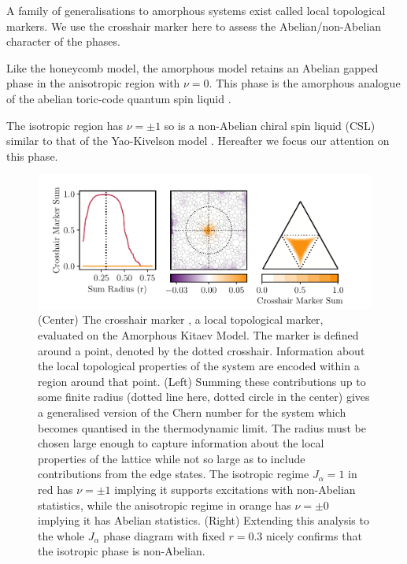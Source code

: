 A family of generalisations to amorphous systems exist
\autocite{mitchellAmorphousTopologicalInsulators2018} called local
topological markers. We use the crosshair marker
\textcite{peru_preprint} here to assess the Abelian/non-Abelian
character of the phases.

Like the honeycomb model, the amorphous model retains an Abelian gapped
phase in the anisotropic region with \(\nu=0\). This phase is the
amorphous analogue of the abelian toric-code quantum spin liquid
\autocite{kitaev_fault-tolerant_2003}.

The isotropic region has \(\nu=\pm1\) so is a non-Abelian chiral spin
liquid (CSL) similar to that of the Yao-Kivelson model
\autocite{yaoExactChiralSpin2007}. Hereafter we focus our attention on
this phase.

\begin{figure}
\hypertarget{fig:phase_diagram_chern}{%
\centering
\includegraphics[width=1\textwidth,height=\textheight]{figure_code/amk_chapter/results/phase_diagram_chern/phase_diagram_chern.pdf}
\caption{(Center) The crosshair marker \textcite{peru_preprint}, a local
topological marker, evaluated on the Amorphous Kitaev Model. The marker
is defined around a point, denoted by the dotted crosshair. Information
about the local topological properties of the system are encoded within
a region around that point. (Left) Summing these contributions up to
some finite radius (dotted line here, dotted circle in the center) gives
a generalised version of the Chern number for the system which becomes
quantised in the thermodynamic limit. The radius must be chosen large
enough to capture information about the local properties of the lattice
while not so large as to include contributions from the edge states. The
isotropic regime \(J_\alpha = 1\) in red has \(\nu = \pm 1\) implying it
supports excitations with non-Abelian statistics, while the anisotropic
regime in orange has \(\nu = \pm 0\) implying it has Abelian statistics.
(Right) Extending this analysis to the whole \(J_\alpha\) phase diagram
with fixed \(r = 0.3\) nicely confirms that the isotropic phase is
non-Abelian.}\label{fig:phase_diagram_chern}
}
\end{figure}

